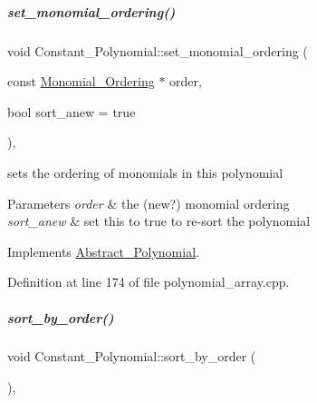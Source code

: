 \mbox{\label{group__polygroup_a539835f92490fbbb5ba3b37e4f80ef49}} 
\subparagraph{\texorpdfstring{set\+\_\+monomial\+\_\+ordering()}{set\_monomial\_ordering()}}
{\footnotesize\ttfamily void Constant\+\_\+\+Polynomial\+::set\+\_\+monomial\+\_\+ordering (\begin{DoxyParamCaption}\item[{const \hyperlink{group__orderinggroup_class_monomial___ordering}{Monomial\+\_\+\+Ordering} $\ast$}]{order,  }\item[{bool}]{sort\+\_\+anew = {\ttfamily true} }\end{DoxyParamCaption})\hspace{0.3cm}{\ttfamily [override]}, {\ttfamily [virtual]}}



sets the ordering of monomials in this polynomial 


\begin{DoxyParams}{Parameters}
{\em order} & the (new?) monomial ordering \\
\hline
{\em sort\+\_\+anew} & set this to {\ttfamily true} to re-\/sort the polynomial \\
\hline
\end{DoxyParams}


Implements \hyperlink{group__polygroup_a12e023570eb675343c4b7ed635a031dc}{Abstract\+\_\+\+Polynomial}.



Definition at line 174 of file polynomial\+\_\+array.\+cpp.

\mbox{\label{group__polygroup_a808018b52eca472a7a1b2995e403f35a}} 
\subparagraph{\texorpdfstring{sort\+\_\+by\+\_\+order()}{sort\_by\_order()}}
{\footnotesize\ttfamily void Constant\+\_\+\+Polynomial\+::sort\+\_\+by\+\_\+order (\begin{DoxyParamCaption}{ }\end{DoxyParamCaption})\hspace{0.3cm}{\ttfamily [override]}, {\ttfamily [virtual]}}



